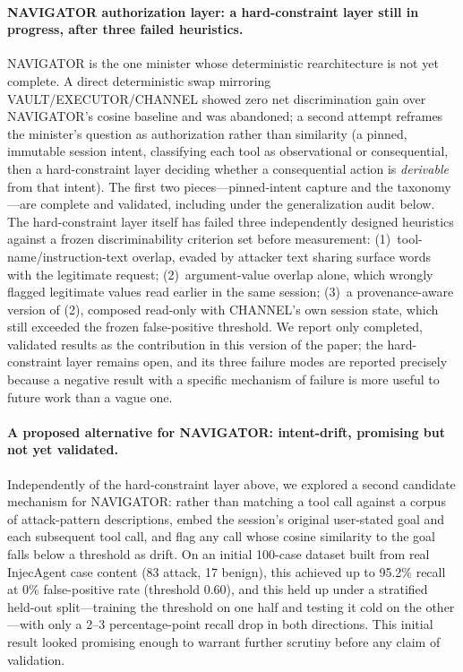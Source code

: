 \documentclass[sigconf,anonymous,review]{acmart}
\begin{document}
\paragraph{NAVIGATOR authorization layer: a hard-constraint layer still in
progress, after three failed heuristics.}
\label{par:navigator-authflow}
NAVIGATOR is the one minister whose deterministic rearchitecture is not yet
complete. A direct deterministic swap mirroring VAULT/EXECUTOR/CHANNEL showed
zero net discrimination gain over NAVIGATOR's cosine baseline and was
abandoned; a second attempt reframes the minister's question as
authorization rather than similarity (a pinned, immutable session intent,
classifying each tool as observational or consequential, then a
hard-constraint layer deciding whether a consequential action is
\emph{derivable} from that intent). The first two pieces---pinned-intent
capture and the taxonomy---are complete and validated, including under the
generalization audit below. The hard-constraint layer itself has failed
three independently designed heuristics against a frozen discriminability
criterion set before measurement: (1)~tool-name/instruction-text overlap,
evaded by attacker text sharing surface words with the legitimate request;
(2)~argument-value overlap alone, which wrongly flagged legitimate values
read earlier in the same session; (3)~a provenance-aware version of (2),
composed read-only with CHANNEL's own session state, which still exceeded
the frozen false-positive threshold. We report only completed, validated
results as the contribution in this version of the paper; the
hard-constraint layer remains open, and its three failure modes are
reported precisely because a negative result with a specific mechanism of
failure is more useful to future work than a vague one.

\paragraph{A proposed alternative for NAVIGATOR: intent-drift, promising but
not yet validated.} Independently of the hard-constraint layer above, we
explored a second candidate mechanism for NAVIGATOR: rather than matching a
tool call against a corpus of attack-pattern descriptions, embed the
session's original user-stated goal and each subsequent tool call, and flag
any call whose cosine similarity to the goal falls below a threshold as
drift. On an initial 100-case dataset built from real InjecAgent case content
(83 attack, 17 benign), this achieved up to 95.2\% recall at 0\%
false-positive rate (threshold 0.60), and this held up under a stratified
held-out split---training the threshold on one half and testing it cold on
the other---with only a 2--3 percentage-point recall drop in both
directions. This initial result looked promising enough to warrant further
scrutiny before any claim of validation.
\end{document}
